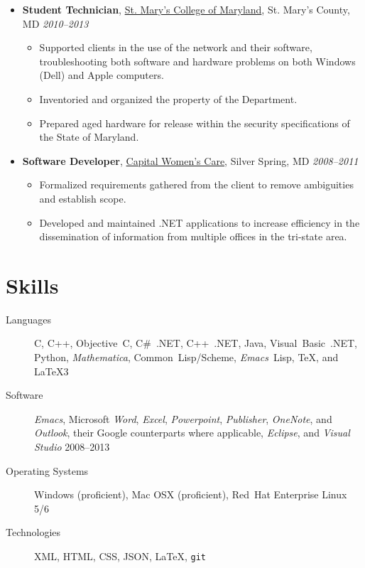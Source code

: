 \documentclass[11pt,letterpaper]{article}
\makeatletter
\newcommand{\position}[5]{\item%
  \begin{tabular*}{1.0\linewidth}{l@{\extracolsep{\fill}}r}
    #1 & #2\\
    \textit{#3} & \textit{#4---#5}
  \end{tabular*}}
\renewcommand{\position}[6][]{%
\item[#1] \hspace*{-2em}\textbf{#4}, #2, #3\hfill
  \textit{#5--#6}\vspace*{-.8em}}
\newcommand{\cwc}{\href{http://www.cwcare.net}{Capital Women's Care}}
\newcommand{\software}[1]{\textsl{#1}}
\makeatother
\begin{document}
\begin{itemize}
\position {\href{http://oit.smcm.edu}
                {St. Mary's College of Maryland}}
          {St. Mary's County, MD}
          {Student Technician}
          {2010}{2013}
          \begin{itemize}
          \item Supported clients in the use of the network and their software,
            troubleshooting both software and hardware problems on both Windows (Dell) and Apple computers.
          \item Inventoried and organized the property of the Department.
          \item Prepared aged hardware for release within the security specifications of the State of Maryland.
          \end{itemize}

\position {\cwc}
          {Silver Spring, MD}
          {Software Developer}
          {2008}{2011}
          \begin{itemize}
          \item Formalized requirements gathered from the client to remove ambiguities and establish scope.
          \item Developed and maintained .NET applications to increase efficiency in the dissemination of information from multiple offices in the tri-state area.
          \end{itemize}
\end{itemize}

\section*{Skills}
  \begin{description}
  \item[Languages]
    C,
    C++,
    Objective~C,
    C\#~.NET,
    C++~.NET,
    Java,
    Visual~Basic~.NET,
    Python,
    \software{Mathematica},
    Common~Lisp\slash Scheme,
    \software{Emacs}~Lisp,
    \TeX,
    and \LaTeX3

  \item[Software] \software{Emacs},
    Microsoft \software{Word},
              \software{Excel},
              \software{Powerpoint},
              \software{Publisher},
              \software{OneNote}, and
              \software{Outlook},
    their Google counterparts where applicable,
    \software{Eclipse},
    and \software{Visual Studio} 2008--2013

  \item[Operating Systems] Windows (proficient),
    Mac OSX (proficient),
    Red~Hat Enterprise Linux 5\slash 6

  \item[Technologies] XML,
    HTML,
    CSS,
    JSON,
    \LaTeX{},
    \texttt{git}
  \end{description}
\end{document}
